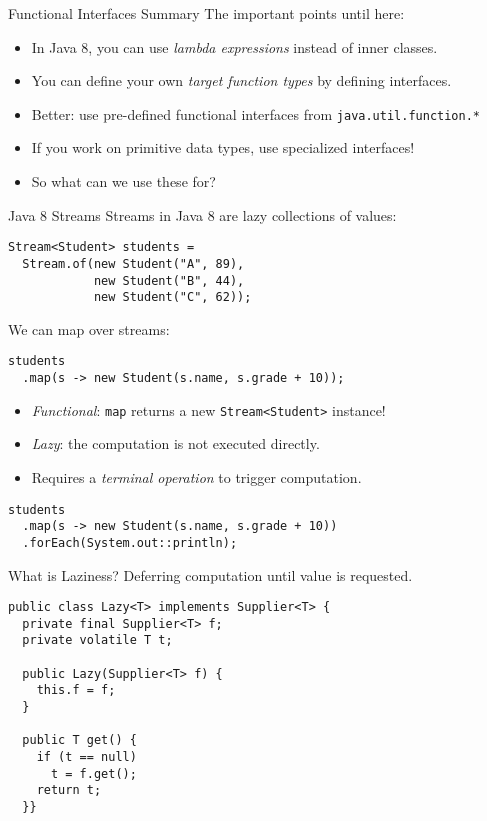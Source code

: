 \documentclass{beamer}
\begin{document}
\begin{frame}{Functional Interfaces Summary}
  The important points until here:

  \begin{itemize}
  \pause{} \item In Java 8, you can use \emph{lambda expressions} instead of inner classes.
  \pause{} \item You can define your own \emph{target function types} by defining interfaces.
  \pause{} \item Better: use pre-defined functional interfaces from \lstinline{java.util.function.*}
  \pause{} \item If you work on primitive data types, use specialized interfaces!
  \pause{} \item So what can we use these for?
  \end{itemize}
\end{frame}

\begin{frame}[fragile]{Java 8 Streams}
Streams in Java 8 are lazy collections of values:

\begin{lstlisting}
Stream<Student> students =
  Stream.of(new Student("A", 89),
            new Student("B", 44),
            new Student("C", 62));
\end{lstlisting}

\pause{} We can map over streams:

\begin{lstlisting}
students
  .map(s -> new Student(s.name, s.grade + 10));
\end{lstlisting}

\begin{itemize}
\pause{} \item \emph{Functional}: \lstinline{map} returns a new \lstinline{Stream<Student>} instance!
\pause{} \item \emph{Lazy}: the computation is not executed directly.
\pause{} \item Requires a \emph{terminal operation} to trigger computation.
\end{itemize}

\pause{}

\begin{lstlisting}
students
  .map(s -> new Student(s.name, s.grade + 10))
  .forEach(System.out::println);
\end{lstlisting}
\end{frame}

\begin{frame}[fragile]{What is Laziness?}
Deferring computation until value is requested.

\begin{lstlisting}
public class Lazy<T> implements Supplier<T> {
  private final Supplier<T> f;
  private volatile T t;

  public Lazy(Supplier<T> f) {
    this.f = f;
  }

  public T get() {
    if (t == null)
      t = f.get();
    return t;
  }}
\end{lstlisting}
\end{frame}
\end{document}
